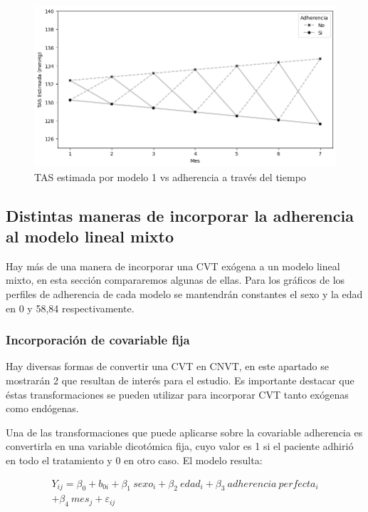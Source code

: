 \documentclass[spanish]{article}
\numberwithin{figure}{subsection}
\numberwithin{equation}{subsection}
\numberwithin{table}{subsection}
\begin{document}
\begin{figure}[H]
	\centering
	\includegraphics[scale=0.5]{img/modelo_1.png}
	\caption{TAS estimada por modelo 1 vs adherencia a través del tiempo}
	\label{modelo_1_plot}
\end{figure}

\subsection{Distintas maneras de incorporar la adherencia al modelo lineal mixto}

Hay más de una manera de incorporar una CVT exógena a un modelo lineal mixto, en
esta sección compararemos algunas de ellas. Para los gráficos de los perfiles de
adherencia de cada modelo se mantendrán constantes el sexo y la edad en 0 y
58,84 respectivamente.

\subsubsection{Incorporación de covariable fija}

Hay diversas formas de convertir una CVT en CNVT, en este apartado se mostrarán
2 que resultan de interés para el estudio. Es importante destacar que éstas
transformaciones se pueden utilizar para incorporar CVT tanto exógenas como
endógenas.

Una de las transformaciones que puede aplicarse sobre la covariable adherencia
es convertirla en una variable dicotómica fija, cuyo valor es 1 si el paciente
adhirió en todo el tratamiento y 0 en otro caso. El modelo resulta:


\begin{multline}
	\label{modelo_2}
	Y_{ij} = \beta_0 + b_{0i} + \beta_1\ sexo_i + \beta_2\ edad_i + \beta_3\ adherencia\ perfecta_i \\
	+ \beta_4\ mes_j + \varepsilon_{ij}
\end{multline}
\end{document}
